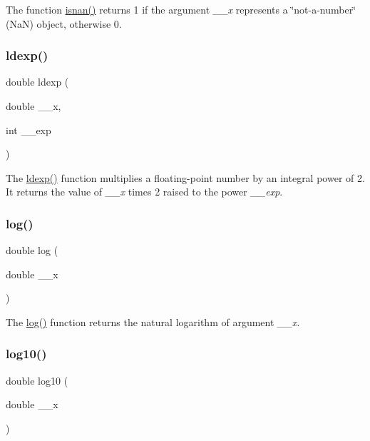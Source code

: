 The function \hyperlink{group__avr__math_gafa5b3d99af3bf027f5742e5c0e6b7095}{isnan()} returns 1 if the argument {\itshape \+\_\+\+\_\+x} represents a \char`\"{}not-\/a-\/number\char`\"{} (NaN) object, otherwise 0. \mbox{\label{group__avr__math_ga71765b713504b7c380b1720e0ac909cc}} 
\subsubsection{\texorpdfstring{ldexp()}{ldexp()}}
{\footnotesize\ttfamily double ldexp (\begin{DoxyParamCaption}\item[{double}]{\+\_\+\+\_\+x,  }\item[{int}]{\+\_\+\+\_\+exp }\end{DoxyParamCaption})}

The \hyperlink{group__avr__math_ga71765b713504b7c380b1720e0ac909cc}{ldexp()} function multiplies a floating-\/point number by an integral power of 2. It returns the value of {\itshape \+\_\+\+\_\+x} times 2 raised to the power {\itshape \+\_\+\+\_\+exp}. \mbox{\label{group__avr__math_ga54ae98f13814deb08e40335a339b6efe}} 
\subsubsection{\texorpdfstring{log()}{log()}}
{\footnotesize\ttfamily double log (\begin{DoxyParamCaption}\item[{double}]{\+\_\+\+\_\+x }\end{DoxyParamCaption})}

The \hyperlink{group__avr__math_ga54ae98f13814deb08e40335a339b6efe}{log()} function returns the natural logarithm of argument {\itshape \+\_\+\+\_\+x}. \mbox{\label{group__avr__math_ga89c64ad3ffb4900c806fb6827c30ed1d}} 
\subsubsection{\texorpdfstring{log10()}{log10()}}
{\footnotesize\ttfamily double log10 (\begin{DoxyParamCaption}\item[{double}]{\+\_\+\+\_\+x }\end{DoxyParamCaption})}

